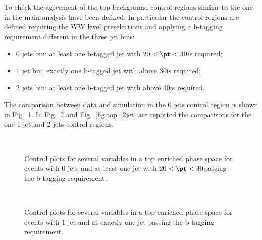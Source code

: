 To check the agreement of the top background control regions similar to the one in the main \hww analysis have been defined. In particular the control regions are defined requiring the WW level preselections and applying a b-tagging requirement different in the three jet bins:
\begin{itemize}
\item 0 jets bin: at least one b-tagged jet with $20 < \pt < 30$\GeV is required;
\item 1 jet bin: exactly one b-tagged jet with \pt above 30\GeV is required;
\item 2 jets bin: at least one b-tagged jet with \pt above 30\GeV is required.
\end{itemize}

The comparison between data and simulation in the 0 jets control region is shown in Fig.~\ref{fig:top_0jet}. In Fig.~\ref{fig:top_1jet} and Fig.~\ref{fig:top_2jet} are reported the comparisons for the one 1 jet and 2 jets control regions.

\begin{figure}[!h]
\centering
{}
\\
\caption{Control plots for several variables in a top enriched phase space for events with 0 jets and at least one jet with $20 < \pt < 30$\GeV passing the b-tagging requirement.}\label{fig:top_0jet}
\end{figure}

\begin{figure}[!h]
\centering
{}
\\
\caption{Control plots for several variables in a top enriched phase space for events with 1 jet and at exactly one jet passing the b-tagging requirement.}\label{fig:top_1jet}
\end{figure}


